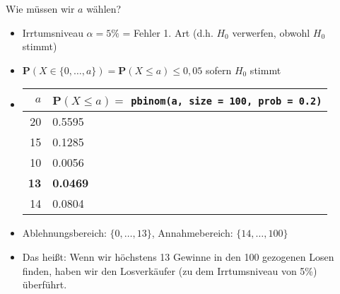 \documentclass[t,11pt,aspectratio=169]{beamer}
\begin{document}
\begin{frame}
\vfill
Wie müssen wir $a$ wählen?
\vfill
\begin{itemize}[<+->]
\item Irrtumsniveau $\alpha=5\%$ = Fehler 1. Art (d.h. $H_0$ verwerfen, obwohl $H_0$ stimmt) 
\item $\mathbf{P}(X\in \{0,\dots,a \})=\mathbf{P}(X\leq a) \leq 0,05$ sofern $H_0$ stimmt
\item[] \begin{center}
			\begin{tabular}{r|l}
				$a$ & $\mathbf{P}(X\leq a) =$ \texttt{pbinom(a, size = 100, prob = 0.2)} \\
				\hline
				20 & 0.5595\\
				15 & 0.1285\\
				10 & 0.0056\\
				\textbf{13} & \textbf{0.0469}\\
				14 & 0.0804
			\end{tabular}
		\end{center}
\item Ablehnungsbereich: $\{0,\dots,13 \}$, Annahmebereich: $\{14,\dots, 100 \}$
\item[] Das heißt: Wenn wir höchstens 13 Gewinne in den 100 gezogenen Losen finden, haben wir den Losverkäufer (zu dem Irrtumsniveau von 5\%) überführt.
\end{itemize}
\vfill
\end{frame}
\end{document}
